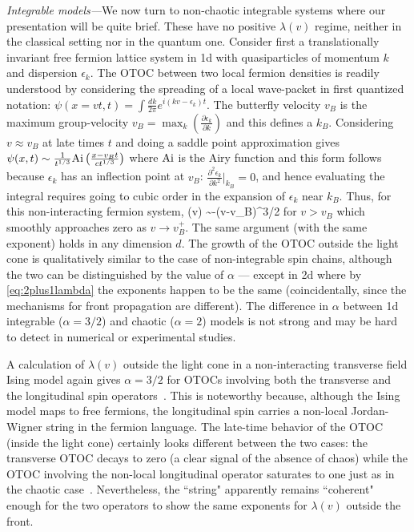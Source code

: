 \documentclass[aps,prl,reprint,superscriptaddress, longbibliography]{revtex4-1}
\newcommand{\vb}{v_B}
\newcommand{\lamv}{\lambda(v)}
\begin{document}
\emph{Integrable models---}We now turn to non-chaotic integrable systems where our presentation will be quite brief. These have no positive $\lamv$ regime, neither in the classical setting nor in the quantum one. Consider first a translationally invariant free fermion lattice system in 1d with quasiparticles of momentum ${k}$ and dispersion $\epsilon_k$. The OTOC between two local fermion densities is readily understood by considering the spreading of a local wave-packet in first quantized notation: $\psi(x = vt ,t) = \int \frac{dk}{2\pi} e^{i (k v - \epsilon_k) t}$. The butterfly velocity $\vb$ is the maximum group-velocity $\vb = \max_k (\frac{\partial \epsilon_k}{\partial k})$ and this defines a $k_B$.  Considering $v \approx \vb$ at late times $t$ and doing a saddle point approximation gives $\psi(x  ,t) \sim \frac{1}{t^{1/3}}{\rm Ai}\left(\frac{x-\vb t}{c t^{1/3}}\right)$ where $\rm{Ai}$ is the Airy function and this form follows because $\epsilon_k$ has an inflection point at $\vb$: $\frac{\partial^2 \epsilon_k}{\partial k^2}|_{k_B} = 0$, and hence evaluating the integral requires going to cubic order in the expansion of $\epsilon_k$ near $k_B$. Thus, for this non-interacting fermion system,
\be
\lambda(v) \sim -(v-\vb)^{3/2}
\ee
for $v>\vb$ which smoothly approaches zero as $v\rightarrow \vb^+$. The same argument (with the same exponent) holds in any dimension $d$. 
The growth of the OTOC outside the light cone is qualitatively similar to the case of non-integrable spin chains, although the two can be 
distinguished  by the value of  $\alpha$ --- except in 2d where by \eqref{eq:2plus1lambda} the exponents happen to be the same (coincidentally, since the mechanisms for front propagation are different). The difference in $\alpha$ between 1d integrable  ($\alpha=3/2$) and  chaotic  ($\alpha=2$) models is not strong and may be hard to detect in numerical or experimental studies. 

A calculation of $\lambda(v)$ outside the light cone in a non-interacting transverse field Ising model again gives ${\alpha = 3/2}$ for OTOCs involving both the transverse and the longitudinal spin operators~\cite{JacobLesik_private}. This is noteworthy because, although the Ising model maps to free fermions, the longitudinal spin carries a non-local Jordan-Wigner string in the fermion language. The late-time behavior of the OTOC (inside the light cone) certainly looks different between the two cases: the transverse OTOC decays to zero (a clear signal of the  absence of chaos) while the OTOC involving the non-local longitudinal operator saturates to one just as in the chaotic case~\cite{MotrunichTFIM_otoc}. Nevertheless, the ``string" apparently remains ``coherent" enough for the two operators to show the same exponents for $\lambda(v)$ outside the front. 
\end{document}
